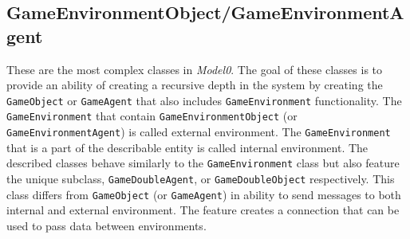 \subsection{GameEnvironmentObject/GameEnvironmentAgent}
These are the most complex classes in \textit{Model0}. The goal of these classes is to provide an ability of creating a recursive depth in the system by creating the \texttt{GameObject} or \texttt{GameAgent} that also includes \texttt{GameEnvironment} functionality. The \texttt{GameEnvironment} that contain \texttt{GameEnvironmentObject} (or \texttt{GameEnvironmentAgent}) is called external environment. The \texttt{GameEnvironment} that is a part of the describable entity is called internal environment. The described classes behave similarly to the \texttt{GameEnvironment} class but also feature the unique subclass, \texttt{GameDoubleAgent}, or \texttt{GameDoubleObject} respectively. This class differs from \texttt{GameObject} (or \texttt{GameAgent}) in ability to send messages to both internal and external environment. The feature creates a connection that can be used to pass data between environments.\par

